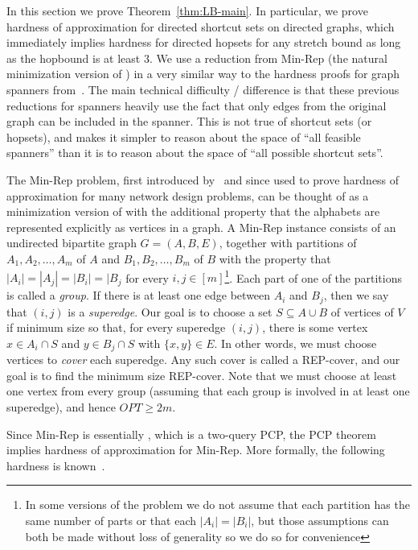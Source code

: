 
In this section we prove Theorem~\ref{thm:LB-main}. 
 In particular, we prove hardness of approximation for directed shortcut sets on directed graphs, which immediately implies hardness for directed hopsets for any stretch bound as long as the hopbound is at least $3$.  We use a reduction from Min-Rep (the natural minimization version of \LabelCover) in a very similar way to the hardness proofs for graph spanners from~\cite{Kor01,EP07,DKR16,CD16}.  The main technical difficulty / difference is that these previous reductions for spanners heavily use the fact that only edges from the original graph can be included in the spanner.  This is not true of shortcut sets (or hopsets), and makes it simpler to reason about the space of ``all feasible spanners'' than it is to reason about the space of ``all possible shortcut sets''.  

The Min-Rep problem, first introduced by~\cite{Kor01} and since used to prove hardness of approximation for many network design problems, can be thought of as a minimization version of \LabelCover with the additional property that the alphabets are represented explicitly as vertices in a graph.  A Min-Rep instance consists of an undirected bipartite graph $G = (A, B, E)$, together with partitions of $A_1, A_2, \dots, A_{m}$ of $A$ and $B_1, B_2, \dots, B_m$ of $B$ with the property that $|A_i| = |A_j| = |B_i| = |B_j$ for every $i,j \in [m]$\footnote{In some versions of the problem we do not assume that each partition has the same number of parts or that each $|A_i|=|B_i|$, but those assumptions can both be made without loss of generality so we do so for convenience}.  Each part of one of the partitions is called a \emph{group}.  If there is at least one edge between $A_i$ and $B_j$, then we say that $(i,j)$ is a \emph{superedge}.  Our goal is to choose a set $S \subseteq A \cup B$ of vertices of $V$ if minimum size so that, for every superedge $(i,j)$, there is some vertex $x \in A_i \cap S$ and $y \in B_j \cap S$ with $\{x,y\} \in E$.  In other words, we must choose vertices to \emph{cover} each superedge.  Any such cover is called a REP-cover, and our goal is to find the minimum size REP-cover.  Note that we must choose at least one vertex from every group (assuming that each group is involved in at least one superedge), and hence $OPT \geq 2m$.  

Since Min-Rep is essentially \LabelCover, which is a two-query PCP, the PCP theorem implies hardness of approximation for Min-Rep.  More formally, the following hardness is known~\cite{Kor01}.

